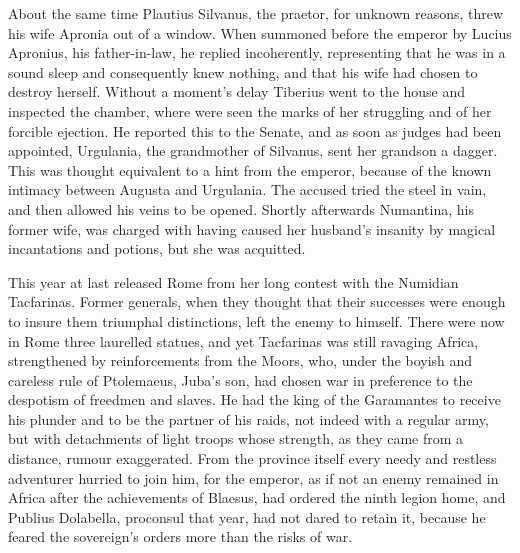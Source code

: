 
About the same time Plautius Silvanus, the praetor, for unknown reasons, threw his wife Apronia out of a window. When summoned before the emperor by Lucius Apronius, his father-in-law, he replied incoherently, representing that he was in a sound sleep and consequently knew nothing, and that his wife had chosen to destroy herself. Without a moment's delay Tiberius went to the house and inspected the chamber, where were seen the marks of her struggling and of her forcible ejection. He reported this to the Senate, and as soon as judges had been appointed, Urgulania, the grandmother of Silvanus, sent her grandson a dagger. This was thought equivalent to a hint from the emperor, because of the known intimacy between Augusta and Urgulania. The accused tried the steel in vain, and then allowed his veins to be opened. Shortly afterwards Numantina, his former wife, was charged with having caused her husband's insanity by magical incantations and potions, but she was acquitted.


This year at last released Rome from her long contest with the Numidian Tacfarinas. Former generals, when they thought that their successes were enough to insure them triumphal distinctions, left the enemy to himself. There were now in Rome three laurelled statues, and yet Tacfarinas was still ravaging Africa, strengthened by reinforcements from the Moors, who, under the boyish and careless rule of Ptolemaeus, Juba's son, had chosen war in preference to the despotism of freedmen and slaves. He had the king of the Garamantes to receive his plunder and to be the partner of his raids, not indeed with a regular army, but with detachments of light troops whose strength, as they came from a distance, rumour exaggerated. From the province itself every needy and restless adventurer hurried to join him, for the emperor, as if not an enemy remained in Africa after the achievements of Blaesus, had ordered the ninth legion home, and Publius Dolabella, proconsul that year, had not dared to retain it, because he feared the sovereign's orders more than the risks of war.



